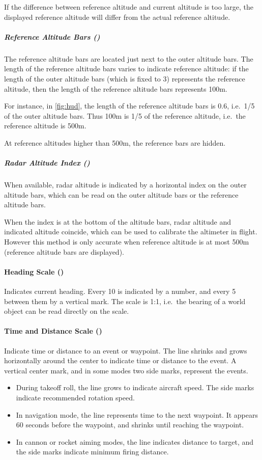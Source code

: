 If the difference between reference altitude and current altitude is too large,
the displayed reference altitude will differ from the actual reference altitude.

\subparagraph{Reference Altitude Bars ()}
The reference altitude bars are located just next to the outer altitude bars.
The length of the reference altitude bars varies to indicate reference altitude:
if the length of the outer altitude bars (which is fixed to 3\textdegree{})
represents the reference altitude, then the length of the reference altitude bars represents 100m.

For instance, in \cref{fig:hud}, the length of the reference altitude bars is
0.6\textdegree{}, i.e.\ 1/5 of the outer altitude bars.
Thus 100m is 1/5 of the reference altitude, i.e.\ the reference altitude is 500m.

At reference altitudes higher than 500m, the reference bars are hidden.

\subparagraph{Radar Altitude Index ()}
When available, radar altitude is indicated by a horizontal index on the outer altitude bars,
which can be read on the outer altitude bars or the reference altitude bars.

When the index is at the bottom of the altitude bars,
radar altitude and indicated altitude coincide,
which can be used to calibrate the altimeter in flight.
However this method is only accurate when reference altitude is at most 500m
(reference altitude bars are displayed).

\paragraph{Heading Scale ()}
Indicates current heading.
Every 10\textdegree{} is indicated by a number,
and every 5\textdegree{} between them by a vertical mark.
The scale is 1:1, i.e.\ the bearing of a world object can be read directly on the scale.

\paragraph{Time and Distance Scale ()}
Indicate time or distance to an event or waypoint.
The line shrinks and grows horizontally around the center to indicate time or distance to the event.
A vertical center mark, and in some modes two side marks, represent the events.
\begin{itemize}
  \item During takeoff roll, the line grows to indicate aircraft speed.
    The side marks indicate recommended rotation speed.
  \item In navigation mode, the line represents time to the next waypoint.
    It appears 60 seconds before the waypoint, and shrinks until reaching the waypoint.
  \item In cannon or rocket aiming modes, the line indicates distance to target,
    and the side marks indicate minimum firing distance.
\end{itemize}

